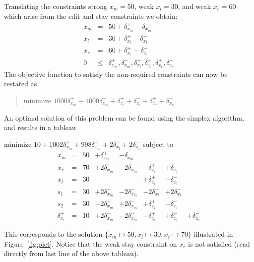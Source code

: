 \documentclass{article}
\newcommand{\strength}{\sf}
\begin{document}
Translating the constraints
{\strength strong} $x_m = 50$, 
{\strength weak} $x_l = 30$,
and {\strength weak} $x_r = 60$
which arise from the 
edit and stay constraints we obtain:
$$\begin{array}{rcl}
x_m & = &50 + \delta_{x_m}^+ -  \delta_{x_m}^- \\
x_l & = &30 + \delta_{x_l}^+ -  \delta_{x_l}^- \\
x_r &= &60 + \delta_{x_r}^+ -  \delta_{x_r}^- \\
0 &\leq& \delta_{x_m}^+, \delta_{x_m}^-, \delta_{x_l}^+, \delta_{x_l}^-, 
        \delta_{x_r}^+, \delta_{x_r}^-
\end{array}$$
The objective function to satisfy the
non-required constraints 
can now be restated as

\begin{quote}\vspace*{-1ex}
minimize $1000 \delta_{x_m}^+ + 1000  \delta_{x_m}^- + \delta_{x_l}^+ +  
        \delta_{x_l}^- + \delta_{x_r}^+ +  \delta_{x_r}^-$.
\end{quote}\vspace{-0.9ex}

An optimal solution of this problem can be found using the simplex algorithm,
and results in a tableau
\begin{trivlist}\item
minimize $10 + 1002 \delta_{x_m}^+ + 998 \delta_{x_m}^-  + 2
\delta_{x_l}^- + 2\delta_{x_r}^- $ 
subject to 
$$
\begin{array}{rlrrrrrr} 
x_m & = &50 &  + \delta_{x_m}^+ & - \delta_{x_m}^- \\
x_r & = &70 & + 2 \delta_{x_m}^+ & - 2\delta_{x_m}^- &
                - \delta_{x_l}^+ & + \delta_{x_l}^- \\ \hline
x_l & = & 30  & & & + \delta_{x_l}^+ & - \delta_{x_l}^- \\
s_1 & = &30 &  + 2 \delta_{x_m}^+ & - 2\delta_{x_m}^- &
                -2 \delta_{x_l}^+ & +2 \delta_{x_l}^- \\
s_2 & = &30 &   - 2 \delta_{x_m}^+ &+2\delta_{x_m}^- &
                + \delta_{x_l}^+ & - \delta_{x_l}^- \\
\delta_{x_r}^+ & = & 10 & + 2 \delta_{x_m}^+  & - 2\delta_{x_m}^- &
        - \delta_{x_l}^+ & + \delta_{x_l}^- & +\delta_{x_r}^-
\end{array}
$$
\end{trivlist}
This corresponds to the solution
$\{x_m \mapsto 50, x_l \mapsto 30, x_r \mapsto 70\}$
illustrated in Figure~\ref{fig:pict}.
Notice that the weak stay constraint on $x_r$ is not satisfied (read
directly from last line of the above tableau).
\end{document}

